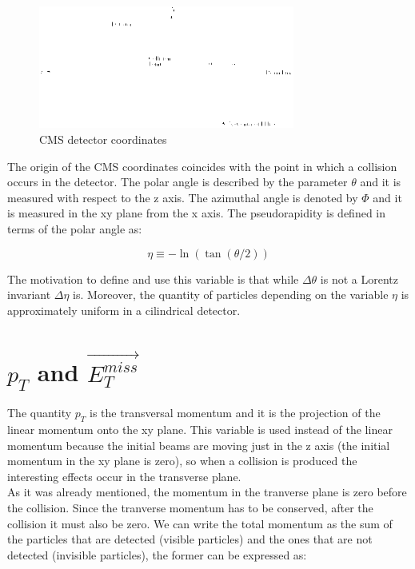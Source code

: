  \begin{figure}[h] \label{CMSCoordinates}
 \centering
 \caption{CMS detector coordinates}
 \includegraphics[width=0.75\textwidth]{./Capitulos/VariableDefinitions/CMS_coordinates}  
 \end{figure}


The origin of the CMS coordinates coincides with the point in which a collision occurs in the detector. 
The polar angle is described by the parameter $\theta$ and it is measured with respect to the z axis.
The azimuthal angle is denoted by $\Phi$ and it is measured in the xy plane from the x axis. The pseudorapidity is defined in terms of the polar angle as:

\begin{equation}
 \eta \equiv - \ln \left( \tan (\theta /2 ) \right)
\end{equation}

 The motivation to define and use this variable is that while $\Delta \theta$ is not a Lorentz invariant $\Delta \eta$ is. Moreover, the quantity of particles depending on the variable $\eta$
 is approximately uniform in a cilindrical detector. 
 
  
 \section{$p_T$ and $\vec{E_T^{miss}}$}

 The quantity $p_T$ is the transversal momentum and it is the projection of the linear momentum onto the xy plane. This variable is used instead of the linear momentum because the initial beams
 are moving just in the z axis (the initial momentum in the xy plane is zero), so when a collision is produced the interesting effects occur in the transverse plane.\\
 
 As it was already mentioned, the momentum in the tranverse plane is zero before the collision. Since the tranverse momentum has to be conserved, after the collision it must also be zero. We can write
 the total momentum as the sum of the particles that are detected (visible particles) and the ones that are not detected (invisible particles), the former can be expressed as:
 
